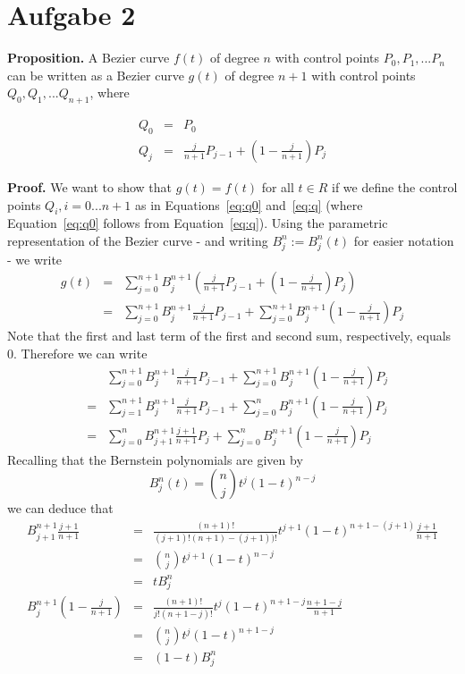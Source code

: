 \documentclass[12pt]{article}
\begin{document}
\section{Aufgabe 2}

\textbf{Proposition.} A Bezier curve $f(t)$ of degree $n$ with control points $P_0, P_1, ... P_n$ can be written as a Bezier curve $g(t)$ of degree $n+1$ with control points $Q_0, Q_1, ... Q_{n+1}$, where 

\begin{eqnarray}
 Q_0 &=& P_0  \label{eq:q0}\\
Q_j &=& \frac{j}{n+1}P_{j-1} + \left(1 - \frac{j}{n+1}\right)P_{j} \label{eq:q}
\end{eqnarray}

\textbf{Proof.} We want to show that $g(t) = f(t)$ for all $t\in R$ if we define the control points $Q_i, i=0...n+1$ as in Equations~\ref{eq:q0} and~\ref{eq:q} (where Equation~\ref{eq:q0} follows from Equation~\ref{eq:q}). Using the parametric representation of the Bezier curve - and writing $B^n_j:= B^n_j(t)$ for easier notation - we write
\begin{eqnarray*}
g(t) &=&  \sum_{j=0}^{n+1} B_j^{n+1}\left(\frac{j}{n+1}P_{j-1} + \left(1 - \frac{j}{n+1}\right)P_{j}\right) \\
      &=&  \sum_{j=0}^{n+1} B_j^{n+1}\frac{j}{n+1}P_{j-1} +\sum_{j=0}^{n+1} B_j^{n+1} \left(1 - \frac{j}{n+1}\right)P_{j}
\end{eqnarray*}
Note that the first and last term of the first and second sum, respectively, equals 0. Therefore we can write 
\begin{eqnarray*}
&&  \sum_{j=0}^{n+1} B_j^{n+1}\frac{j}{n+1}P_{j-1} +\sum_{j=0}^{n+1} B_j^{n+1} \left(1 - \frac{j}{n+1}\right)P_{j} \\
&=&  \sum_{j=1}^{n+1} B_j^{n+1}\frac{j}{n+1}P_{j-1} +\sum_{j=0}^{n} B_j^{n+1} \left(1 - \frac{j}{n+1}\right)P_{j} \\
&=&  \sum_{j=0}^{n} B_{j+1}^{n+1}\frac{j+1}{n+1}P_{j} +\sum_{j=0}^{n} B_j^{n+1} \left(1 - \frac{j}{n+1}\right)P_{j}
\end{eqnarray*}
Recalling that the Bernstein polynomials are given by
\begin{equation*}
B_j^n(t)={n \choose j}t^j(1-t)^{n-j}
\end{equation*}
we can deduce that
\begin{eqnarray*}
B_{j+1}^{n+1}\frac{j+1}{n+1} &=& \frac{(n+1)!}{(j+1)!(n+1)-(j+1))!}t^{j+1}(1-t)^{n+1-(j+1)} \frac{j+1}{n+1} \\
&=& {n \choose j}t^{j+1}(1-t)^{n-j} \\
&=& tB_j^{n} \\
 B_j^{n+1} \left(1 - \frac{j}{n+1}\right) &=& \frac{(n+1)!}{j!(n+1-j)!}t^{j}(1-t)^{n+1-j} \frac{n+1-j}{n+1}\\
&=& {n \choose j}t^{j}(1-t)^{n+1-j} \\
&=&(1- t)B_j^{n}
\end{eqnarray*}
\end{document}
